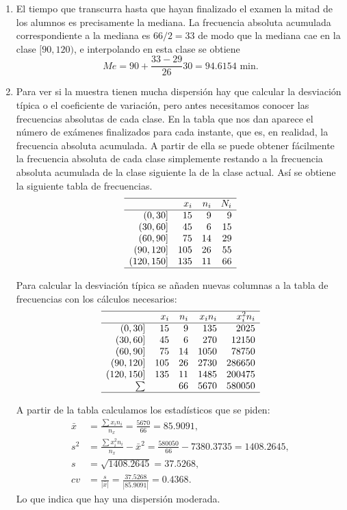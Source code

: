 {\begin{enumerate}
\item El tiempo que transcurra hasta que hayan finalizado el examen la mitad de los alumnos es precisamente la mediana.
La frecuencia absoluta acumulada correspondiente a la mediana es $66/2 = 33$ de modo que la mediana cae en la clase $[90,120)$, e interpolando en esta clase se obtiene
\[
Me = 90+\frac{33-29}{26}30 = 94.6154 \text{ min}.
\]  
\item Para ver si la muestra tienen mucha dispersión hay que calcular la desviación típica o el coeficiente de variación, pero antes necesitamos
conocer las frecuencias absolutas de cada clase. En la tabla que nos dan aparece el número de exámenes finalizados para cada instante, que es,
en realidad, la frecuencia absoluta acumulada. A partir de ella se puede obtener fácilmente la frecuencia absoluta de cada clase simplemente
restando a la frecuencia absoluta acumulada de la clase siguiente la de la clase actual. Así se obtiene la siguiente tabla de frecuencias. 
\[
\begin{array}{rrrr}
  \hline
 & x_i & n_i & N_i \\ 
  \hline
(0,30] & 15 & 9 & 9 \\ 
  (30,60] & 45 & 6 & 15 \\ 
  (60,90] & 75 & 14 & 29 \\ 
  (90,120] & 105 & 26 & 55 \\ 
  (120,150] & 135 & 11 & 66 \\ 
   \hline
\end{array}\]

Para calcular la desviación típica se añaden nuevas columnas a la tabla de frecuencias con los cálculos necesarios:
\[
\begin{array}{rrrrr}
  \hline
 & x_i & n_i & x_in_i & x_i^2n_i \\ 
  \hline
(0,30] & 15 & 9 & 135 & 2025 \\ 
  (30,60] & 45 & 6 & 270 & 12150 \\ 
  (60,90] & 75 & 14 & 1050 & 78750 \\ 
  (90,120] & 105 & 26 & 2730 & 286650 \\ 
  (120,150] & 135 & 11 & 1485 & 200475 \\ 
  \sum &  & 66 & 5670 & 580050 \\ 
   \hline
\end{array}\]

A partir de la tabla calculamos los estadísticos que se piden:
\begin{align*}
\bar x &= \frac{\sum x_in_i}{n_x} = \frac{5670}{66} = 85.9091,\\
s^2 & = \frac{\sum x_i^2n_i}{n_x}-\bar x^2 = \frac{580050}{66}-7380.3735 = 1408.2645,\\
s & = \sqrt{1408.2645} = 37.5268,\\
cv & = \frac{s}{|\bar x|} = \frac{37.5268}{|85.9091|} = 0.4368.
\end{align*}
Lo que indica que hay una dispersión moderada. 
\end{enumerate}
}


